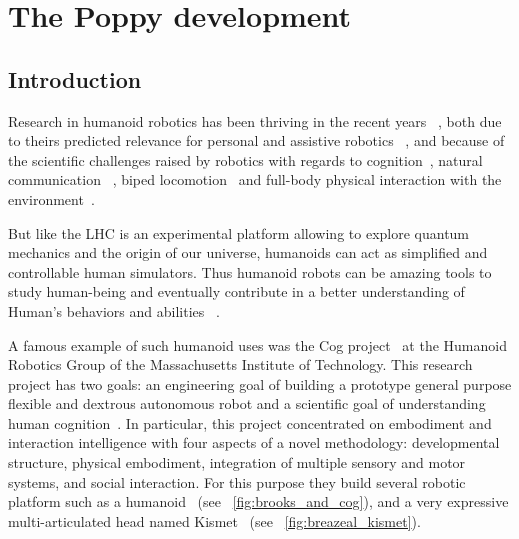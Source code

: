 
\cleartoleftpage


\chapter{The Poppy development} %


\section{Introduction} %

Research in humanoid robotics has been thriving in the recent years~\cite{hirai1998development} \cite{kaneko2008humanoid}, both due to theirs predicted relevance for personal and assistive robotics~\cite{tapus2007socially} \cite{oztop2005human}, and because of the scientific challenges raised by robotics with regards to cognition~\cite{asada2001cognitive}, natural communication~\cite{stiefelhagen2004natural} \cite{breazeal2002robots}, biped locomotion~\cite{yamaguchi1999development} \cite{chestnutt2005footstep} \cite{collins2005bipedal} and full-body physical interaction with the environment~\cite{ude2004programming}.

But like the LHC is an experimental platform allowing to explore quantum mechanics and the origin of our universe,  humanoids can act as simplified and controllable human simulators. Thus humanoid robots can be amazing tools to study human-being and eventually contribute in a better understanding of Human's behaviors and abilities~\cite{atkeson2000using} \cite{cheng2007cb} \cite{brooks1986achieving}.

A famous example of such humanoid uses was the Cog project~\cite{brooks1999cog} at the Humanoid Robotics Group of the Massachusetts Institute of Technology. This research project has two goals: an engineering goal of building a prototype general purpose flexible and dextrous autonomous robot and a scientific goal of understanding human cognition~\cite{brooks1994building}. In particular, this project concentrated on embodiment and interaction intelligence with four aspects of a novel methodology: developmental structure, physical embodiment, integration of multiple sensory and motor systems, and social interaction. For this purpose they build several robotic platform such as a humanoid~\cite{brooks1999cog} (see \figurename~\ref{fig:brooks_and_cog}), and a very expressive multi-articulated head named Kismet~\cite{breazeal2003emotion} (see \figurename~\ref{fig:breazeal_kismet}).

